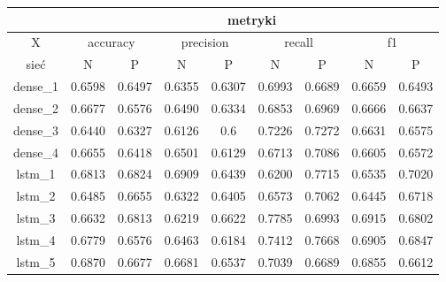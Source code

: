 \begin{table}[p]
\begin{tabular}{|c|c|c|c|c|c|c|c|c|}
                 & \multicolumn{8}{c|}{metryki}                                                                                                                               \\ \hline
        X        & \multicolumn{2}{c|}{accuracy} & \multicolumn{2}{c|}{precision} & \multicolumn{2}{c|}{recall} & \multicolumn{2}{c|}{f1}                                     \\ \hline
        sieć     & N                             & P                              & N                           & P                       & N      & P      & N      & P      \\ \hline
        dense\_1 & 0.6598                        & 0.6497                         & 0.6355                      & 0.6307                  & 0.6993 & 0.6689 & 0.6659 & 0.6493 \\ \hline
        dense\_2 & 0.6677                        & 0.6576                         & 0.6490                      & 0.6334                  & 0.6853 & 0.6969 & 0.6666 & 0.6637 \\ \hline
        dense\_3 & 0.6440                        & 0.6327                         & 0.6126                      & 0.6                     & 0.7226 & 0.7272 & 0.6631 & 0.6575 \\ \hline
        dense\_4 & 0.6655                        & 0.6418                         & 0.6501                      & 0.6129                  & 0.6713 & 0.7086 & 0.6605 & 0.6572 \\ \hline
        lstm\_1  & 0.6813                        & 0.6824                         & 0.6909                      & 0.6439                  & 0.6200 & 0.7715 & 0.6535 & 0.7020 \\ \hline
        lstm\_2  & 0.6485                        & 0.6655                         & 0.6322                      & 0.6405                  & 0.6573 & 0.7062 & 0.6445 & 0.6718 \\ \hline
        lstm\_3  & 0.6632                        & 0.6813                         & 0.6219                      & 0.6622                  & 0.7785 & 0.6993 & 0.6915 & 0.6802 \\ \hline
        lstm\_4  & 0.6779                        & 0.6576                         & 0.6463                      & 0.6184                  & 0.7412 & 0.7668 & 0.6905 & 0.6847 \\ \hline
        lstm\_5  & 0.6870                        & 0.6677                         & 0.6681                      & 0.6537                  & 0.7039 & 0.6689 & 0.6855 & 0.6612 \\ \hline

\end{tabular}
\end{table}
